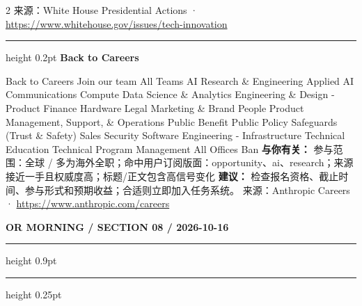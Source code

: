 \documentclass[10.5pt]{ctexart}
\begin{document}
\begin{multicols}{2}
{\footnotesize\color{ormuted} 来源：White House Presidential Actions · \url{https://www.whitehouse.gov/issues/tech-innovation}}
\vspace{2mm}
\hrule height 0.2pt
\vspace{2mm}
{\large\bfseries Back to Careers}\par
Back to Careers Join our team All Teams AI Research \& Engineering Applied AI Communications Compute Data Science \& Analytics Engineering \& Design - Product Finance Hardware Legal Marketing \& Brand People Product Management, Support, \& Operations Public Benefit Public Policy Safeguards (Trust \& Safety) Sales Security Software Engineering - Infrastructure Technical Education Technical Program Management All Offices Ban
\textbf{与你有关：} 参与范围：全球 / 多为海外全职；命中用户订阅版面：opportunity、ai、research；来源接近一手且权威度高；标题/正文包含高信号变化
\textbf{建议：} 检查报名资格、截止时间、参与形式和预期收益；合适则立即加入任务系统。
{\footnotesize\color{ormuted} 来源：Anthropic Careers · \url{https://www.anthropic.com/careers}}
\end{multicols}
\newpage
{\small\bfseries OR MORNING / SECTION 08 / 2026-10-16}
\vspace{2mm}
\hrule height 0.9pt
\vspace{1.5mm}
\hrule height 0.25pt
\vspace{4mm}
\end{document}
